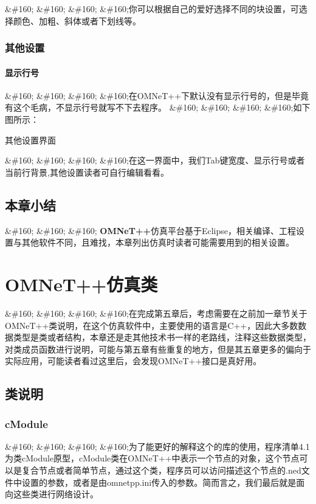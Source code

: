 \&\#160; \&\#160; \&\#160; \&\#160;你可以根据自己的爱好选择不同的块设置，可选择颜色、加粗、斜体或者下划线等。

\subsection{其他设置}
\label{其他设置}

\subsubsection{显示行号}
\label{显示行号}

\&\#160; \&\#160; \&\#160; \&\#160;在OMNeT++下默认没有显示行号的，但是毕竟有这个毛病，不显示行号就写不下去程序。
\&\#160; \&\#160; \&\#160; \&\#160;如下图所示：

其他设置界面


\&\#160; \&\#160; \&\#160; \&\#160;在这一界面中，我们Tab键宽度、显示行号或者当前行背景,其他设置读者可自行编辑看看。

\section{本章小结}
\label{本章小结}

\&\#160; \&\#160; \&\#160; \textbf{OMNeT++}仿真平台基于Eclipse，相关编译、工程设置与其他软件不同，且难找，本章列出仿真时读者可能需要用到的相关设置。

\chapter{OMNeT++仿真类}
\label{omnet仿真类}

\&\#160; \&\#160; \&\#160; \&\#160;在完成第五章后，考虑需要在之前加一章节关于OMNeT++类说明，在这个仿真软件中，主要使用的语言是C++，因此大多数数据类型是类或者结构，本章还是走其他技术书一样的老路线，注释这些数据类型，对类成员函数进行说明，可能与第五章有些重复的地方，但是其五章更多的偏向于实际应用，可能读者看过这里后，会发现OMNeT++接口是真好用。

\section{类说明}
\label{类说明}

\subsection{cModule}
\label{cmodule}

\&\#160; \&\#160; \&\#160; \&\#160;为了能更好的解释这个的库的使用，程序清单4.1为类cModule原型，cModule类在OMNeT++中表示一个节点的对象，这个节点可以是复合节点或者简单节点，通过这个类，程序员可以访问描述这个节点的.ned文件中设置的参数，或者是由omnetpp.ini传入的参数。简而言之，我们最后就是面向这些类进行网络设计。

